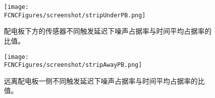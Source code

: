 \begin{figure}[H]
\centering
\texttt{[image: \\FCNCFigures/screenshot/stripUnderPB.png]}
\caption{配电板下方的传感器不同触发延迟下噪声占据率与时间平均占据率的比值。}
\label{fig:stripUnderPB}
\end{figure}

\begin{figure}[H]
\centering
\texttt{[image: \\FCNCFigures/screenshot/stripAwayPB.png]}
\caption{远离配电板一侧不同触发延迟下噪声占据率与时间平均占据率的比值。}
\label{fig:stripAwayPB}
\end{figure}
